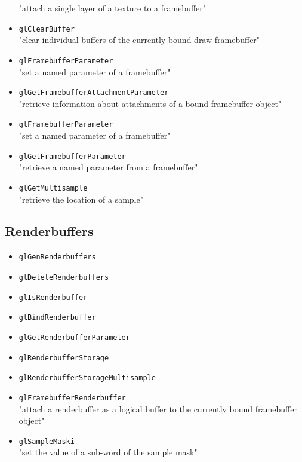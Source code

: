 \documentclass[12pt]{article}
\begin{document}
\begin{itemize}
	"attach a single layer of a texture to a framebuffer"
\item \texttt{glClearBuffer} \\
	"clear individual buffers of the currently bound draw framebuffer"
\item \texttt{glFramebufferParameter} \\
	"set a named parameter of a framebuffer"
\item \texttt{glGetFramebufferAttachmentParameter} \\
	"retrieve information about attachments of a bound framebuffer object"
\item \texttt{glFramebufferParameter} \\
	"set a named parameter of a framebuffer"
\item \texttt{glGetFramebufferParameter} \\
	"retrieve a named parameter from a framebuffer"
\item \texttt{glGetMultisample} \\
	"retrieve the location of a sample"
\end{itemize}

\subsection{Renderbuffers}
\begin{itemize}
\item \texttt{glGenRenderbuffers} \\
\item \texttt{glDeleteRenderbuffers} \\
\item \texttt{glIsRenderbuffer} \\
\item \texttt{glBindRenderbuffer} \\
\item \texttt{glGetRenderbufferParameter} \\
\item \texttt{glRenderbufferStorage} \\
\item \texttt{glRenderbufferStorageMultisample} \\
\item \texttt{glFramebufferRenderbuffer} \\
	"attach a renderbuffer as a logical buffer to the currently bound framebuffer object"
\item \texttt{glSampleMaski} \\
	"set the value of a sub-word of the sample mask"
\end{itemize}
\end{document}

